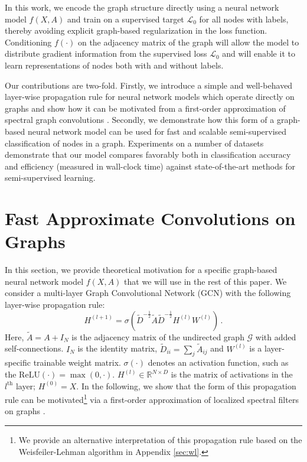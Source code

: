 \documentclass{article} %
\begin{document}
In this work, we encode the graph structure directly using a neural network model $f(X, A)$ and train on a supervised target $\mathcal{L}_0$ for all nodes with labels, thereby avoiding explicit graph-based regularization in the loss function. Conditioning $f(\cdot)$ on the adjacency matrix of the graph will allow the model to distribute gradient information from the supervised loss $\mathcal{L}_0$ and will enable it to learn representations of nodes both with and without labels.

Our contributions are two-fold. Firstly, we introduce a simple and well-behaved layer-wise propagation rule for neural network models which operate directly on graphs and show how it can be motivated from a first-order approximation of spectral graph convolutions \citep{hammond2011wavelets}. Secondly, we demonstrate how this form of a graph-based neural network model can be used for fast and scalable semi-supervised classification of nodes in a graph. Experiments on a number of datasets demonstrate that our model compares favorably both in classification accuracy and efficiency (measured in wall-clock time) against state-of-the-art methods for semi-supervised learning.

\section{Fast Approximate Convolutions on Graphs}
\label{sec:fast-convs}

In this section, we provide theoretical motivation for a specific graph-based neural network model $f(X, A)$ that we will use in the rest of this paper. We consider a multi-layer Graph Convolutional Network (GCN) with the following layer-wise propagation rule:
\begin{equation}
  \textstyle
  H^{(l+1)}= \sigma\!\left(\tilde{D}^{-\frac{1}{2}} \tilde{A}\tilde{D}^{-\frac{1}{2}}H^{(l)} W^{(l)} \right) \, .
\label{eq:gcn-layer}
\end{equation}
Here, $\tilde{A} = A + I_N$ is the adjacency matrix of the undirected graph $\mathcal{G}$ with added self-connections.  $I_N$ is the identity matrix, $\tilde{D}_{ii} = \sum_j \tilde{A}_{ij}$ and $W^{(l)}$ is a layer-specific trainable weight matrix. $\sigma(\cdot)$ denotes an activation function, such as the $\mathrm{ReLU}(\cdot) = \max(0,\cdot)$. $H^{(l)}\in \mathbb{R}^{N\times D}$ is the matrix of activations in the $l^{\text{th}}$ layer; $H^{(0)}=X$. In the following, we show that the form of this propagation rule can be motivated\footnote{We provide an alternative interpretation of this propagation rule based on the Weisfeiler-Lehman algorithm \citep{weisfeiler1968reduction} in Appendix \ref{sec:wl}.} via a first-order approximation of localized spectral filters on graphs \citep{hammond2011wavelets, defferrard2016convolutional}.
\end{document}
